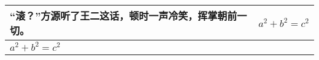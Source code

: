 \documentclass[hyperref,UTF8]{ctexart}
\begin{document}
\begin{table}
\centering
\begin{tabular}{|l|l|}
\hline 
	\parbox[c][3cm][t]{3cm} 
	{“滚？”方源听了王二这话，顿时一声冷笑，挥掌朝前一切。}
&
	\parbox[c][3cm][c]{3cm} 
	{$a^2+b^2=c^2$}
\\ 
\hline 
	\parbox[c][3cm][b]{3cm} 
	{$a^2+b^2=c^2$}
&
	\parbox[c][3cm][c]{3cm} 
	{}
\\
\hline
\end{tabular}
\end{table}
\end{document}
